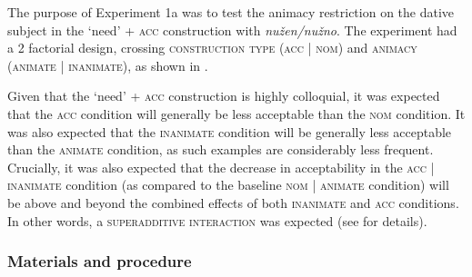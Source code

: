 \documentclass[output=paper]{langscibook}
\begin{document}
The purpose of Experiment 1a was to test the animacy restriction on the dative subject in the `need' + \textsc{acc} construction with \textit{nužen/nužno}. The experiment had a 2 factorial design, crossing \textsc{construction type} (\textsc{acc} | \textsc{nom}) and \textsc{animacy} (\textsc{animate} | \textsc{inanimate}), as shown in .

\ea \label{exp1-materials}
\z\z

\noindent Given that the `need' + \textsc{acc} construction is highly colloquial, it was expected that the \textsc{acc} condition will generally be less acceptable than the \textsc{nom} condition. It was also expected that the \textsc{inanimate} condition will be generally less acceptable than the \textsc{animate} condition, as such examples are considerably less frequent. Crucially, it was also expected that the decrease in acceptability in the \textsc{acc} | \textsc{inanimate} condition (as compared to the baseline \textsc{nom} | \textsc{animate} condition) will be above and beyond the combined effects of both \textsc{inanimate} and \textsc{acc} conditions. In other words, a \textsc{superadditive interaction} was expected (see \citealt{Sprouse.Wagers.Phillips2012} for details).

\subsubsection{Materials and procedure}
\end{document}
